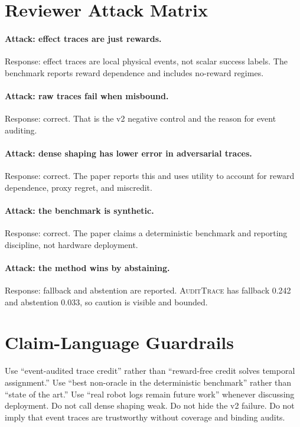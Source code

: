 \documentclass{article}
\newcommand{\method}{\textsc{AuditTrace}\xspace}
\begin{document}
\section{Reviewer Attack Matrix}

\paragraph{Attack: effect traces are just rewards.}
Response: effect traces are local physical events, not scalar success labels. The benchmark reports reward dependence and includes no-reward regimes.

\paragraph{Attack: raw traces fail when misbound.}
Response: correct. That is the v2 negative control and the reason for event auditing.

\paragraph{Attack: dense shaping has lower error in adversarial traces.}
Response: correct. The paper reports this and uses utility to account for reward dependence, proxy regret, and miscredit.

\paragraph{Attack: the benchmark is synthetic.}
Response: correct. The paper claims a deterministic benchmark and reporting discipline, not hardware deployment.

\paragraph{Attack: the method wins by abstaining.}
Response: fallback and abstention are reported. \method has fallback 0.242 and abstention 0.033, so caution is visible and bounded.

\section{Claim-Language Guardrails}

Use ``event-audited trace credit'' rather than ``reward-free credit solves temporal assignment.'' Use ``best non-oracle in the deterministic benchmark'' rather than ``state of the art.'' Use ``real robot logs remain future work'' whenever discussing deployment. Do not call dense shaping weak. Do not hide the v2 failure. Do not imply that event traces are trustworthy without coverage and binding audits.
\end{document}
